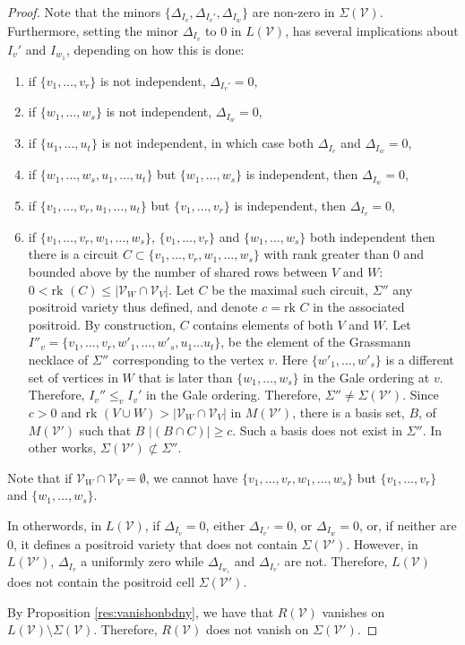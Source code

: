 \documentclass[11pt]{article}
\newcommand{\rk}{\textrm{rk }}
\newcommand{\cV}{\mathcal{V}}
\theoremstyle{remark}
\theoremstyle{definition}
\begin{document}
\begin{proof}
Note that the minors $\{\Delta_{I_v}, \Delta_{I_v'}, \Delta_{I_w}\}$ are non-zero in $\Sigma(\cV)$. Furthermore, setting the minor $\Delta_{I_v}$ to $0$ in $L(\cV)$, has several implications about $I_v'$ and $I_{w_1}$, depending on how this is done: 
\begin{enumerate} 
\item if  $\{v_1, \ldots, v_r\}$ is not independent, $\Delta_{I_v'} = 0$, 
\item if $\{w_1, \ldots, w_s\}$ is not independent, $\Delta_{I_w} = 0$,
\item if $\{u_1, \ldots, u_t\}$ is not independent, in which case both $\Delta_{I_v}$ and $\Delta_{I_w} = 0$,
\item if $\{w_1, \ldots, w_s, u_1, \ldots, u_t\}$ but $\{w_1, \ldots, w_s\}$ is independent, then $\Delta_{I_w} = 0$,
\item if $\{v_1, \ldots, v_r, u_1, \ldots, u_t\}$ but $\{v_1, \ldots, v_r\}$ is independent, then $\Delta_{I_v} = 0$,
\item if $\{v_1, \ldots, v_r, w_1, \ldots, w_s\}$, $\{v_1, \ldots, v_r\}$ and $\{w_1, \ldots, w_s\}$ both independent then there is a circuit $C \subset \{v_1, \ldots, v_r, w_1, \ldots, w_s\}$ with rank greater than $0$ and bounded above by the number of shared rows between $V$ and $W$: $0 < \rk(C) \leq |\cV_W \cap \cV_V|$. Let $C$ be the maximal such circuit, $\Sigma''$ any positroid variety thus defined, and denote $c = \rk C$ in the associated positroid. By construction, $C$ contains elements of both $V$ and $W$. Let $I''_v = \{v_1, \ldots, v_r, w'_1, \ldots, w'_s, u_1 \ldots u_t\}$, be the element of the Grassmann necklace of $\Sigma''$ corresponding to the vertex $v$. Here $\{w'_1, \ldots, w'_s\}$ is a different set of vertices in $W$ that is later than $\{w_1, \ldots, w_s\}$ in the Gale ordering at $v$. Therefore, $I_v'' \leq_v I_v'$ in the Gale ordering. Therefore, $\Sigma'' \neq \Sigma(\cV')$. Since $c > 0$ and $\rk (V\cup W) > |\cV_W \cap \cV_V|$ in $M(\cV')$,  there is a basis set, $B$, of $M(\cV')$ such that $B$ $|(B \cap C)| \geq c$. Such a basis does not exist in $\Sigma''$. In other works, $\Sigma(\cV') \not \subset \Sigma''$.
\end{enumerate}

Note that if $\cV_W \cap \cV_V = \emptyset$, we cannot have $\{v_1, \ldots, v_r, w_1, \ldots, w_s\}$ but $\{v_1, \ldots, v_r\}$ and $\{w_1, \ldots, w_s\}$.

In otherwords, in $L(\cV)$, if $\Delta_{I_v} = 0$, either $\Delta_{I_v'} = 0$, or $\Delta_{I_w} = 0$, or, if neither are $0$, it defines a positroid variety that does not contain $\Sigma(\cV')$. However, in $L(\cV')$, $\Delta_{I_v}$ a uniformly zero while $\Delta_{I_{w_1}}$ and $\Delta_{I_v'}$ are not. Therefore, $L(\cV)$ does not contain the positroid cell $\Sigma(\cV')$.

By Proposition \ref{res:vanishonbdny}, we have that $R(\cV)$ vanishes on $L(\cV) \setminus \Sigma(\cV)$. Therefore, $R(\cV)$ does not vanish on $\Sigma(\cV')$. 
\end{proof}
\end{document}
